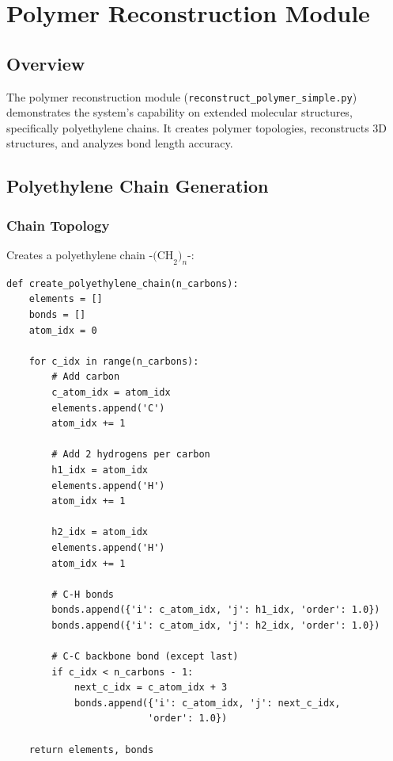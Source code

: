 \documentclass[11pt,a4paper]{article}
\begin{document}
\clearpage

\section{Polymer Reconstruction Module}

\subsection{Overview}

The polymer reconstruction module (\texttt{reconstruct\_polymer\_simple.py}) demonstrates the system's capability on extended molecular structures, specifically polyethylene chains. It creates polymer topologies, reconstructs 3D structures, and analyzes bond length accuracy.

\subsection{Polyethylene Chain Generation}

\subsubsection{Chain Topology}

Creates a polyethylene chain $\text{-(CH}_2\text{)}_n$-:

\begin{lstlisting}[caption={Polyethylene Chain Creation (lines 20-66)}]
def create_polyethylene_chain(n_carbons):
    elements = []
    bonds = []
    atom_idx = 0

    for c_idx in range(n_carbons):
        # Add carbon
        c_atom_idx = atom_idx
        elements.append('C')
        atom_idx += 1

        # Add 2 hydrogens per carbon
        h1_idx = atom_idx
        elements.append('H')
        atom_idx += 1

        h2_idx = atom_idx
        elements.append('H')
        atom_idx += 1

        # C-H bonds
        bonds.append({'i': c_atom_idx, 'j': h1_idx, 'order': 1.0})
        bonds.append({'i': c_atom_idx, 'j': h2_idx, 'order': 1.0})

        # C-C backbone bond (except last)
        if c_idx < n_carbons - 1:
            next_c_idx = c_atom_idx + 3
            bonds.append({'i': c_atom_idx, 'j': next_c_idx,
                         'order': 1.0})

    return elements, bonds
\end{lstlisting}
\end{document}
